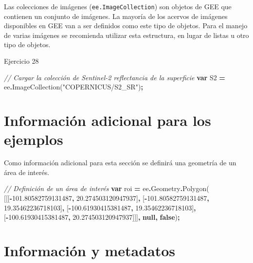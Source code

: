 \documentclass[
  12pt,
  letterpaper,
  twoside]{book}
\newenvironment{Shaded}{\begin{snugshade}}{\end{snugshade}}
\newcommand{\AttributeTok}[1]{\textcolor[rgb]{0.77,0.63,0.00}{#1}}
\newcommand{\CommentTok}[1]{\textcolor[rgb]{0.56,0.35,0.01}{\textit{#1}}}
\newcommand{\FloatTok}[1]{\textcolor[rgb]{0.00,0.00,0.81}{#1}}
\newcommand{\FunctionTok}[1]{\textcolor[rgb]{0.00,0.00,0.00}{#1}}
\newcommand{\KeywordTok}[1]{\textcolor[rgb]{0.13,0.29,0.53}{\textbf{#1}}}
\newcommand{\NormalTok}[1]{#1}
\newcommand{\OperatorTok}[1]{\textcolor[rgb]{0.81,0.36,0.00}{\textbf{#1}}}
\newcommand{\StringTok}[1]{\textcolor[rgb]{0.31,0.60,0.02}{#1}}
\begin{document}
Las colecciones de imágenes (\texttt{ee.ImageCollection}) son objetos de GEE que contienen un conjunto de imágenes. La mayoría de los acervos de imágenes disponibles en GEE van a ser definidos como este tipo de objetos. Para el manejo de varias imágenes se recomienda utilizar esta estructura, en lugar de listas u otro tipo de objetos.

Ejercicio 28

\begin{Shaded}
\begin{Highlighting}[]
\CommentTok{// Cargar la colección de Sentinel{-}2 reflectancia de la superficie}
\KeywordTok{var}\NormalTok{ S2 }\OperatorTok{=}\NormalTok{ ee}\OperatorTok{.}\FunctionTok{ImageCollection}\NormalTok{(}\StringTok{"COPERNICUS/S2\_SR"}\NormalTok{)}\OperatorTok{;}
\end{Highlighting}
\end{Shaded}

\hypertarget{informaciuxf3n-adicional-para-los-ejemplos-1}{%
\section{Información adicional para los ejemplos}\label{informaciuxf3n-adicional-para-los-ejemplos-1}}

Como información adicional para esta sección se definirá una geometría de un área de interés.

\begin{Shaded}
\begin{Highlighting}[]
\CommentTok{// Definición de un área de interés}
\KeywordTok{var}\NormalTok{ roi }\OperatorTok{=}\NormalTok{ ee}\OperatorTok{.}\AttributeTok{Geometry}\OperatorTok{.}\FunctionTok{Polygon}\NormalTok{(}
\NormalTok{        [[[}\OperatorTok{{-}}\FloatTok{101.80582759131487}\OperatorTok{,} \FloatTok{20.274503120947937}\NormalTok{]}\OperatorTok{,}
\NormalTok{          [}\OperatorTok{{-}}\FloatTok{101.80582759131487}\OperatorTok{,} \FloatTok{19.35462236718103}\NormalTok{]}\OperatorTok{,}
\NormalTok{          [}\OperatorTok{{-}}\FloatTok{100.61930415381487}\OperatorTok{,} \FloatTok{19.35462236718103}\NormalTok{]}\OperatorTok{,}
\NormalTok{          [}\OperatorTok{{-}}\FloatTok{100.61930415381487}\OperatorTok{,} \FloatTok{20.274503120947937}\NormalTok{]]]}\OperatorTok{,} \KeywordTok{null}\OperatorTok{,} \KeywordTok{false}\NormalTok{)}\OperatorTok{;}
\end{Highlighting}
\end{Shaded}

\hypertarget{informaciuxf3n-y-metadatos-4}{%
\section{Información y metadatos}\label{informaciuxf3n-y-metadatos-4}}
\end{document}
